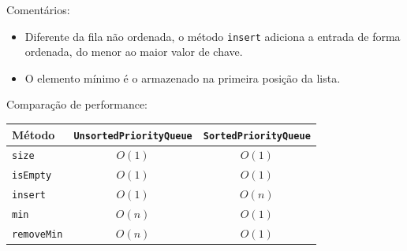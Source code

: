 \medskip

{\color{redtext}
	Comentários:
	\begin{itemize}
		\item Diferente da fila não ordenada, o método \texttt{insert} adiciona a entrada de forma ordenada, do menor ao maior valor de chave.
		\item O elemento mínimo é o armazenado na primeira posição da lista.
	\end{itemize}
}

\medskip

Comparação de performance:

\begin{table}[H]
	\centering
	\renewcommand{\arraystretch}{1.2}
	\begin{tabular}{lcc}
		\hline
		Método & \texttt{UnsortedPriorityQueue} & \texttt{SortedPriorityQueue} \\
		\hline
		\texttt{size} & $O(1)$ & $O(1)$ \\
		\texttt{isEmpty} & $O(1)$ & $O(1)$ \\
		\texttt{insert} & $O(1)$ & $O(n)$ \\
		\texttt{min} & $O(n)$ & $O(1)$ \\
		\texttt{removeMin} & $O(n)$ & $O(1)$ \\
		\hline
	\end{tabular}
\end{table}

\medskip


